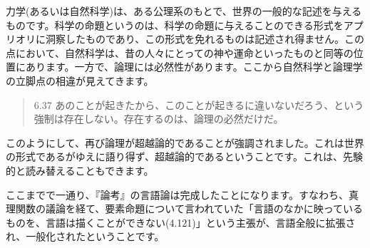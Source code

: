 \documentclass[11pt,a4paper]{jsbook}
\begin{document}
力学(あるいは自然科学)は、ある公理系のもとで、世界の一般的な記述を与えるものです。科学の命題というのは、科学の命題に与えることのできる形式をアプリオリに洞察したものであり、この形式を免れるものは記述され得ません。この点において、自然科学は、昔の人々にとっての神や運命といったものと同等の位置にあります。一方で、論理には必然性があります。ここから自然科学と論理学の立脚点の相違が見えてきます。
\begin{quote}
6.37 あのことが起きたから、このことが起きるに違いないだろう、という強制は存在しない。存在するのは、論理の必然だけだ。
\end{quote}
\par
このようにして、再び論理が超越論的であることが強調されました。これは世界の形式であるがゆえに語り得ず、超越論的であるということです。これは、先験的と読み替えることもできます。\par
ここまでで一通り、『論考』の言語論は完成したことになります。すなわち、真理関数の議論を経て、要素命題について言われていた「言語のなかに映っているものを、言語は描くことができない(4.121)」という主張が、言語全般に拡張され、一般化されたということです。
\end{document}
